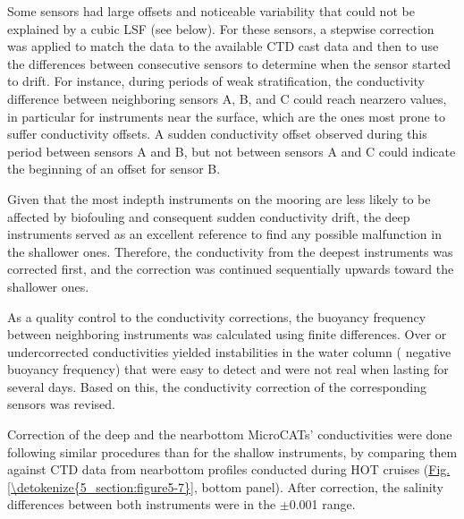 \documentclass[a4paper,10pt,english,openany,oneside]{sphinxmanual}
\begin{document}
\sphinxAtStartPar
Some sensors had large offsets and noticeable variability that could not
be explained by a cubic LSF (see below). For these sensors, a stepwise
correction was applied to match the data to the available CTD cast data and
then to use the differences between consecutive sensors to determine when the
sensor started to drift. For instance, during periods of weak stratification,
the conductivity difference between neighboring sensors A, B, and C could reach
near\sphinxhyphen{}zero values, in particular for instruments near the surface, which are the
ones most prone to suffer conductivity offsets. A sudden conductivity offset
observed during this period between sensors A and B, but not between sensors A
and C could indicate the beginning of an offset for sensor B.

\sphinxAtStartPar
Given that the most in\sphinxhyphen{}depth instruments on the mooring are less likely to be
affected by biofouling and consequent sudden conductivity drift, the deep
instruments served as an excellent reference to find any possible malfunction
in the shallower ones. Therefore, the conductivity from the deepest instruments
was corrected first, and the correction was continued sequentially upwards
toward the shallower ones.

\sphinxAtStartPar
As a quality control to the conductivity corrections, the buoyancy frequency
between neighboring instruments was calculated using finite differences. Over\sphinxhyphen{}
or under\sphinxhyphen{}corrected conductivities yielded instabilities in the water column (
negative buoyancy frequency) that were easy to detect and were not real when
lasting for several days. Based on this, the conductivity correction of the
corresponding sensors was revised.

\sphinxAtStartPar
Correction of the deep and the near\sphinxhyphen{}bottom MicroCATs’ conductivities were done following
similar procedures than for the shallow instruments, by comparing them
against CTD data from near\sphinxhyphen{}bottom profiles conducted during HOT cruises
(\hyperref[\detokenize{5_section:figure5-7}]{Fig.\@ \ref{\detokenize{5_section:figure5-7}}}, bottom panel). After correction, the salinity
differences between both instruments were in the \(\pm\)0.001 range.
\end{document}
